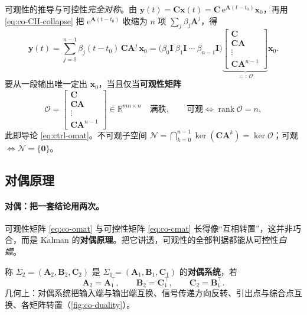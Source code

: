 可观性的推导与可控性\emph{完全对称}。由 $\mathbf{y}(t)=\mathbf{C}\mathbf{x}(t)=\mathbf{C}\,\mathrm{e}^{\mathbf{A}(t-t_0)}\mathbf{x}_0$，再用 \cref{eq:co-CH-collapse} 把 $\mathrm{e}^{\mathbf{A}(t-t_0)}$ 收缩为 $n$ 项 $\sum_j\beta_j\mathbf{A}^j$，得
\begin{equation}
  \mathbf{y}(t)=\sum_{j=0}^{n-1}\beta_j(t-t_0)\,\mathbf{C}\mathbf{A}^j\,\mathbf{x}_0
  =\big(\beta_0\mathbf{I}\ \beta_1\mathbf{I}\ \cdots\ \beta_{n-1}\mathbf{I}\big)
  \underbrace{\begin{bmatrix}\mathbf{C}\\ \mathbf{C}\mathbf{A}\\ \vdots\\ \mathbf{C}\mathbf{A}^{n-1}\end{bmatrix}}_{=:\,\mathcal{O}}\mathbf{x}_0.
  \label{eq:co-omat-derive}
\end{equation}
要从一段输出唯一定出 $\mathbf{x}_0$，当且仅当\textbf{可观性矩阵}
\begin{equation}
  \mathcal{O}=\begin{bmatrix}\mathbf{C}\\ \mathbf{C}\mathbf{A}\\ \vdots\\ \mathbf{C}\mathbf{A}^{n-1}\end{bmatrix}\in\mathbb{R}^{mn\times n}
  \quad\text{满秩},\qquad \text{可观}\iff\operatorname{rank}\mathcal{O}=n,
  \label{eq:co-omat}
\end{equation}
此即导论 \cref{eq:ctrl-omat}\cite{liubao2006modern}。不可观子空间 $\mathcal{N}=\bigcap_{k=0}^{n-1}\ker(\mathbf{C}\mathbf{A}^k)=\ker\mathcal{O}$；可观 $\iff\mathcal{N}=\{\mathbf{0}\}$。

\subsection{对偶原理}
\label{sec:co-duality}

\paragraph{对偶：把一套结论用两次。}
可观性矩阵 \cref{eq:co-omat} 与可控性矩阵 \cref{eq:co-cmat} 长得像“互相转置”，这并非巧合，而是 Kalman 的\textbf{对偶原理}\cite{kalman1960general,liubao2006modern}。把它讲透，可观性的全部判据都能从可控性\emph{白嫖}。

\begin{definition}[对偶系统]\label{def:co-dual}
称 $\Sigma_2=(\mathbf{A}_2,\mathbf{B}_2,\mathbf{C}_2)$ 是 $\Sigma_1=(\mathbf{A}_1,\mathbf{B}_1,\mathbf{C}_1)$ 的\textbf{对偶系统}，若
\begin{equation}
  \mathbf{A}_2=\mathbf{A}_1^\top,\qquad \mathbf{B}_2=\mathbf{C}_1^\top,\qquad \mathbf{C}_2=\mathbf{B}_1^\top.
  \label{eq:co-dual-def}
\end{equation}
几何上：对偶系统把输入端与输出端互换、信号传递方向反转、引出点与综合点互换、各矩阵转置（\cref{fig:co-duality}）\cite{liubao2006modern}。
\end{definition}

